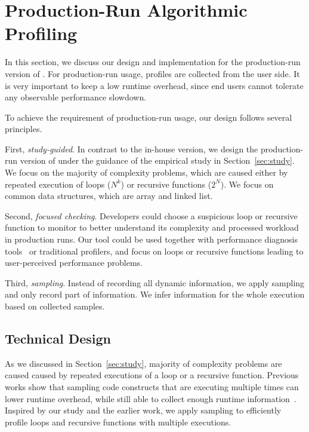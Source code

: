 \newpage
\section{Production-Run Algorithmic Profiling}
\label{sec:online}

In this section, we discuss our design and 
implementation for the production-run version of \Tool. 
For production-run usage, profiles are collected from the user side.
It is very important to keep a low runtime overhead, since
end users cannot tolerate any observable performance slowdown.

To achieve the requirement of production-run usage,
our design follows several principles. 

First, \textit{study-guided}. 
In contrast to the in-house version,
we design the production-run version of \Tool
under the guidance of the empirical study in Section~\ref{sec:study}.
We focus on the majority of complexity problems, 
which are caused either by repeated execution of loops ($N^k$)
or recursive functions ($2^N$).
We focus on common data structures, which are array and linked list.

Second, \textit{focused checking}.
Developers could choose a suspicious loop or recursive function to monitor 
to better understand its complexity and processed workload in production runs.
Our tool could be used together with performance diagnosis tools~\cite{SongOOPSLA2014} 
or traditional profilers,
and focus on loops or recursive functions leading 
to user-perceived performance problems.

Third, \textit{sampling}.
Instead of recording all dynamic information, 
we apply sampling and only record part of information. 
We infer information for the whole execution based on collected samples. 


\subsection{Technical Design}
As we discussed in Section~\ref{sec:study}, 
majority of complexity problems are caused 
caused by repeated executions of a loop or a recursive function. 
Previous works show that sampling code constructs that are executing 
multiple 
times can lower runtime overhead, 
while still able to collect enough runtime information~\cite{SongOOPSLA2014,ldoctor}. 
Inspired by our study and the earlier work, 
we apply sampling to efficiently profile loops and recursive functions with multiple executions. 

